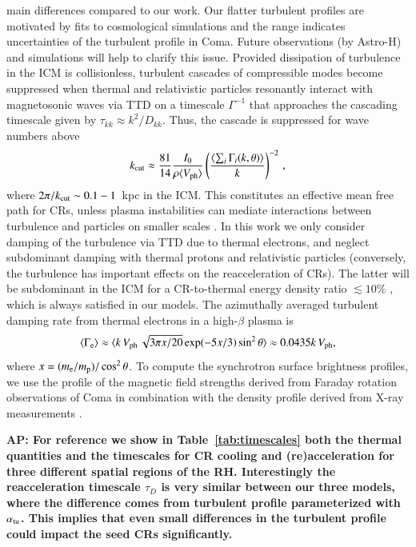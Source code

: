 \documentclass[a4paper,fleqn,usenatbib]{mnras}
\newcommand{\Vph}{V_\mathrm{ph}}
\def\AP#1{{\bf  AP: #1}}
\begin{document}
main differences compared to our work. Our flatter turbulent profiles
are motivated by fits to cosmological simulations
\citep{2009ApJ...705.1129L,2010ApJ...725.1452S,2011A&A...529A..17V,2012ApJ...758...74B}
and the range indicates uncertainties of the turbulent profile in
Coma. Future observations (by Astro-H) and simulations will help to
clarify this issue. Provided dissipation of turbulence in the ICM is
collisionless, turbulent cascades of compressible modes become
suppressed when thermal and relativistic particles resonantly interact
with magnetosonic waves via TTD on a timescale $\Gamma^{-1}$ that
approaches the cascading timescale given by $\tau_{kk} \approx
k^2/D_{kk}$. Thus, the cascade is suppressed for wave numbers above
\begin{equation}
\label{eq:kc}
  k_\rmn{cut} \approx \frac{81}{14} \frac{I_0}{\rho \langle \Vph \rangle}
  \left(\frac{\langle\sum_i \Gamma_i(k,\theta)\rangle}{k}\right)^{-2}\,,
\end{equation}
where $2\pi/k_{\mathrm{cut}}\sim 0.1-1$~kpc in the ICM. This constitutes an
effective mean free path for CRs, unless plasma instabilities can
mediate interactions between turbulence and particles on smaller
scales \citep{brunetti11}. In this work we only consider damping of
the turbulence via TTD due to thermal electrons, and neglect
subdominant damping with thermal protons and relativistic particles
(conversely, the turbulence has important effects on the
reacceleration of CRs). The latter will be subdominant in the ICM for
a CR-to-thermal energy density ratio $\lesssim 10 \%$
\citep{brunetti07}, which is always satisfied in our models. The
azimuthally averaged turbulent damping rate from thermal electrons
\citep{brunetti07} in a high-$\beta$ plasma is
\begin{equation}
\label{eq:Gamma_e}
\langle\Gamma_{\rmn{e}}\rangle \approx \langle k\,\Vph\,\sqrt{3\pi
  x/20}\exp(-5x/3)\sin^2{\theta}\rangle\approx 0.0435k\,\Vph, 
\end{equation}
where $x=(m_{{\mathrm{e}}}/m_{{\mathrm{p}}})/\cos^2{\theta}$. To compute the
synchrotron surface brightness profiles, we use the profile of the
magnetic field strengths derived from Faraday rotation observations of
Coma \citep{bonafede10} in combination with the density profile
derived from X-ray measurements \citep{1992A&A...259L..31B}.

\AP{For reference we show in Table~\ref{tab:timescales} both the thermal
  quantities and the timescales for CR cooling and (re)acceleration
  for three different spatial regions of the RH. Interestingly the
  reacceleration timescale $\tau_D$ is very similar between our three
  models, where the difference comes from turbulent profile
  parameterized with $\alpha_{\mathrm{tu}}$. This implies that even small
  differences in the turbulent profile could impact the seed CRs
  significantly.}
\end{document}
